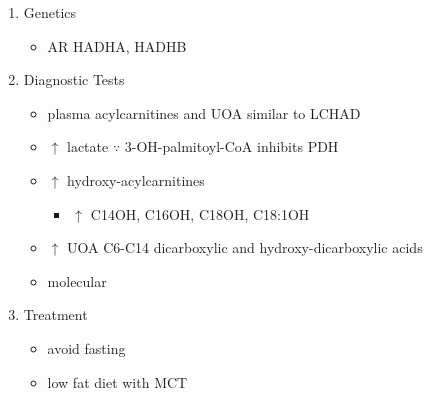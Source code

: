 \documentclass[12pt]{scrartcl}
\begin{document}
\begin{enumerate}
\item Genetics
\label{sec:orga4e0d2b}
\begin{itemize}
\item AR HADHA, HADHB
\end{itemize}

\item Diagnostic Tests
\label{sec:org0d2f634}
\begin{itemize}
\item plasma acylcarnitines and UOA similar to LCHAD
\item \(\uparrow\) lactate \(\because\) 3-OH-palmitoyl-CoA inhibits PDH
\item \(\uparrow\) hydroxy-acylcarnitines
\begin{itemize}
\item \(\uparrow\) C14OH, C16OH, C18OH, C18:1OH
\end{itemize}
\item \(\uparrow\) UOA C6-C14 dicarboxylic and hydroxy-dicarboxylic acids
\item molecular
\end{itemize}

\item Treatment
\label{sec:org43c9dc2}
\begin{itemize}
\item avoid fasting
\item low fat diet with MCT
\end{itemize}
\end{enumerate}
\end{document}
